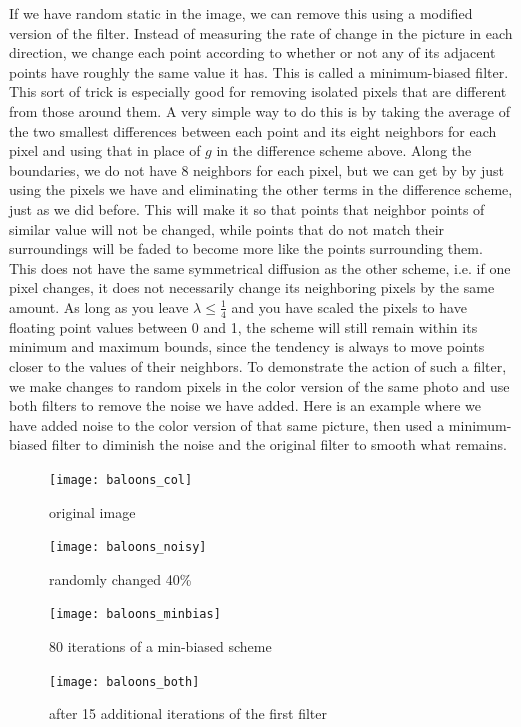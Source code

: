 If we have random static in the image, we can remove this using a modified version of the filter.
Instead of measuring the rate of change in the picture in each direction, we change each point according to whether or not any of its adjacent points have roughly the same value it has. 
This is called a minimum-biased filter. 
This sort of trick is especially good for removing isolated pixels that are different from those around them.
A very simple way to do this is by taking the average of the two smallest differences between each point and its eight neighbors for each pixel and using that in place of $g$ in the difference scheme above.
Along the boundaries, we do not have 8 neighbors for each pixel, but we can get by by just using the pixels we have and eliminating the other terms in the difference scheme, just as we did before.
This will make it so that points that neighbor points of similar value will not be changed, while points that do not match their surroundings will be faded to become more like the points surrounding them.
This does not have the same symmetrical diffusion as the other scheme, i.e. if one pixel changes, it does not necessarily change its neighboring pixels by the same amount.
As long as you leave $\lambda \leq \frac{1}{4}$ and you have scaled the pixels to have floating point values between 0 and 1, the scheme will still remain within its minimum and maximum bounds, since the tendency is always to move points closer to the values of their neighbors.
To demonstrate the action of such a filter, we make changes to random pixels in the color version of the same photo and use both filters to remove the noise we have added.
Here is an example where we have added noise to the color version of that same picture, then used a minimum-biased filter to diminish the noise and the original filter to smooth what remains.

\newpage
\vfill
\begin{figure}[ht]
\begin{minipage}[b]{0.45\linewidth}
\centering
\texttt{[image: baloons\_col]}
\caption*{original image}
\end{minipage}
\hspace{0.5cm}
\begin{minipage}[b]{0.45\linewidth}
\centering
\texttt{[image: baloons\_noisy]}
\caption*{randomly changed 40\%}
\end{minipage}
\begin{minipage}[b]{0.45\linewidth}
\centering
\texttt{[image: baloons\_minbias]}
\caption*{80 iterations of a min-biased scheme}
\end{minipage}
\hspace{0.5cm}
\begin{minipage}[b]{0.45\linewidth}
\centering
\texttt{[image: baloons\_both]}
\caption*{after 15 additional iterations of the first filter}
\end{minipage}
\end{figure}
\vfill
\clearpage

